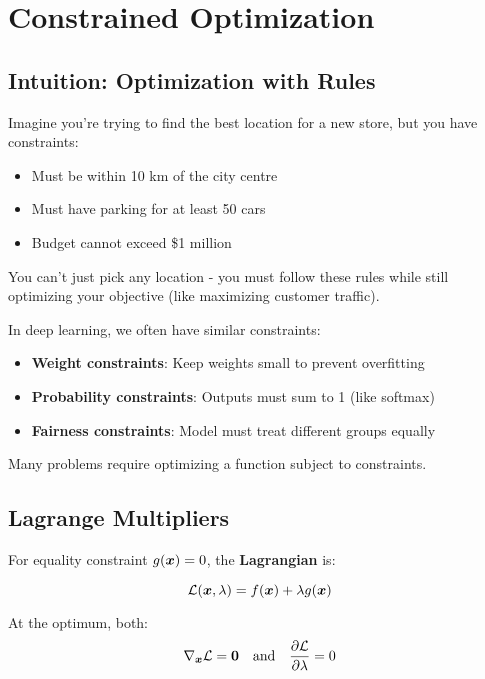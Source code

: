 
\section{Constrained Optimization }
\label{sec:constrained-optimization}

\subsection{Intuition: Optimization with Rules}

Imagine you're trying to find the best location for a new store, but you have constraints:
\begin{itemize}
    \item Must be within 10 km of the city centre
    \item Must have parking for at least 50 cars
    \item Budget cannot exceed \$1 million
\end{itemize}

You can't just pick any location - you must follow these rules while still optimizing your objective (like maximizing customer traffic).

In deep learning, we often have similar constraints:
\begin{itemize}
    \item \textbf{Weight constraints}: Keep weights small to prevent overfitting
    \item \textbf{Probability constraints}: Outputs must sum to 1 (like softmax)
    \item \textbf{Fairness constraints}: Model must treat different groups equally
\end{itemize}

Many problems require optimizing a function subject to constraints.

\subsection{Lagrange Multipliers}

For equality constraint $g(\boldsymbol{x}) = 0$, the \textbf{Lagrangian} is:

\begin{equation}
\mathcal{L}(\boldsymbol{x}, \lambda) = f(\boldsymbol{x}) + \lambda g(\boldsymbol{x})
\end{equation}

At the optimum, both:
\begin{equation}
\nabla_{\boldsymbol{x}} \mathcal{L} = \boldsymbol{0} \quad \text{and} \quad \frac{\partial \mathcal{L}}{\partial \lambda} = 0
\end{equation}

